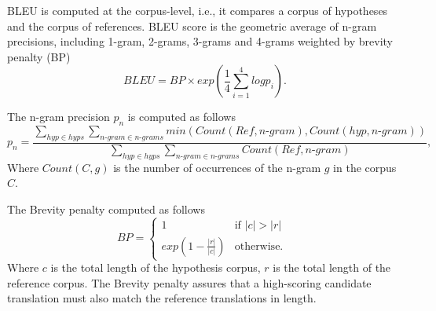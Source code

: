 BLEU is computed at the corpus-level, i.e., it compares a corpus of hypotheses and the corpus of references. BLEU score is the geometric average of n-gram precisions, including 1-gram, 2-grams, 3-grams and 4-grams weighted by brevity penalty (BP)
\begin{equation}
BLEU = BP \times exp(\frac{1}{4}\sum_{i=1}^4log p_i).
\end{equation}

The n-gram precision $p_n$ is computed as follows
\begin{equation}
p_n = \frac{\sum_{hyp \in hyps}\sum_{n\text{-}gram \in n\text{-}grams} min(Count(Ref,n\text{-}gram), Count(hyp, n\text{-}gram))}{\sum_{hyp \in hyps}\sum_{n\text{-}gram \in n\text{-}grams} Count(Ref,n\text{-}gram)},
\end{equation}
Where $Count(C,g)$ is the number of occurrences of the n-gram $g$ in the corpus $C$.

The Brevity penalty computed as follows
\begin{equation}
  BP =
    \begin{cases}
      1 & \text{if $|c| > |r|$ }\\
      exp(1-\frac{|r|}{|c|}) & \text{otherwise}.
    \end{cases}       
\end{equation}
Where $c$ is the total length of the hypothesis corpus, $r$ is the total length of the reference corpus. The Brevity penalty assures that a high-scoring candidate translation must also match the reference translations in length.







































